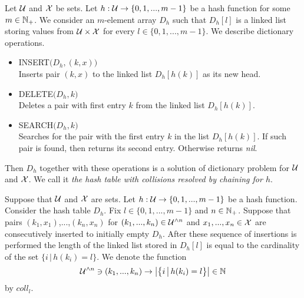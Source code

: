 \begin{definition}
Let ${\mathcal U}$ and ${\mathcal X}$ be sets. Let $h:{\mathcal U}\rightarrow \{0,1,...,m-1\}$ be a hash function for some $m\in {\mathbb N}_+$. We consider an $m$-element array $D_h$ such that $D_h[l]$ is a linked list storing values from ${\mathcal U}\times {\mathcal X}$ for every $l\in \{0,1,...,m-1\}$. We describe dictionary operations.
\begin{itemize}
\item[] \textrm{INSERT}$\big(D_h,(k,x)\big)$\\
Inserts pair $(k,x)$ to the linked list $D_h[h(k)]$ as its new head.
\item[] \textrm{DELETE}$\big(D_h,k\big)$\\
Deletes a pair with first entry $k$ from the linked list $D_h[h(k)]$.
\item[] \textrm{SEARCH}$\big(D_h,k\big)$\\
Searches for the pair with the first entry $k$ in the list $D_h[h(k)]$. If such pair is found, then returns its second entry. Otherwise returns \textit{nil}. 
\end{itemize}
Then $D_h$ together with these operations is a solution of dictionary problem for ${\mathcal U}$ and ${\mathcal X}$. We call it \textit{the hash table with collisions resolved by chaining for $h$}.
\end{definition}
\noindent
Suppose that ${\mathcal U}$ and ${\mathcal X}$ are sets. Let $h:{\mathcal U}\rightarrow \{0,1,...,m-1\}$ be a hash function. Consider the hash table $D_h$. Fix $l\in \{0,1,...,m-1\}$ and $n\in {\mathbb N}_+$. Suppose that pairs $(k_1,x_1)$,...,$(k_n,x_n)$ for $(k_1,...,k_n)\in {\mathcal U}^{\wedge n}$ and $x_1,...,x_n\in {\mathcal X}$ are consecutively inserted to initially empty $D_h$. After these sequence of insertions is performed the length of the linked list stored in $D_h[l]$ is equal to the cardinality of the set $\big\{i\,\big|\,h(k_i) = l\big\}$. We denote the function
$${\mathcal U}^{\wedge n}\ni (k_1,...,k_n)\rightarrow \big|\big\{i\,\big|\,h(k_i) = l\big\}\big|\in {\mathbb N}$$
by $coll_l$.

